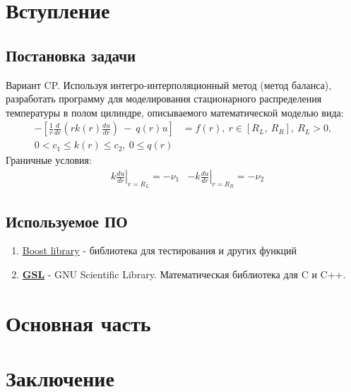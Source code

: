 \documentclass[a4paper,12pt]{article}
\begin{document}
	
	\newpage
	\tableofcontents
	\newpage

	\section{Вступление}
	\subsection{Постановка задачи}

	Вариант CP. Используя интегро-интерполяционный метод (метод баланса), разработать программу для моделирования стационарного распределения температуры в полом цилиндре, описываемого математической моделью вида:
	\begin{align*}
		-\left[ \frac{1}{r} \frac{d}{dr} \left(r k(r)\frac{du}{dr} \right)\ -\ q(r)u \right]
		&= f(r),\ r \in \left[ R_L,\ R_R\right],\ R_L > 0,
		\\
		 0 < c_1 \leq k(r) \leq c_2,\ 0 \leq q(r)&
	\end{align*}
	Граничные условия: \newline
	\begin{align*}
		&k \left. \frac{du}{dr}\right\vert_{r = R_L} = -\nu _1
		&-k \left. \frac{du}{dr}\right\vert_{r = R_R} = -\nu_2
	\end{align*}
	\subsection{Используемое ПО}

	\begin{enumerate}
		\item \href{https://www.boost.org/}{Boost library} - библиотека для тестирования и других функций
		\item \href{https://www.gnu.org/software/gsl/}{\textbf{GSL}} - GNU Scientific Library. Математическая библиотека для C и C++.
	\end{enumerate}
	\newpage

	\section{Основная часть}
	

	
	\newpage

	
	\newpage

	
	\newpage

	\section{Заключение}
\end{document}
